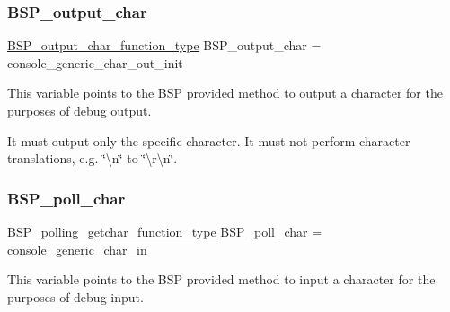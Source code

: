 \subsubsection{\texorpdfstring{BSP\_output\_char}{BSP\_output\_char}}
{\footnotesize\ttfamily \mbox{\hyperlink{bspIo_8h_a0b0dff1c3d35110ae303b4098c60dc14}{B\+S\+P\+\_\+output\+\_\+char\+\_\+function\+\_\+type}} B\+S\+P\+\_\+output\+\_\+char = console\+\_\+generic\+\_\+char\+\_\+out\+\_\+init}

This variable points to the B\+SP provided method to output a character for the purposes of debug output.

It must output only the specific character. It must not perform character translations, e.\+g. \char`\"{}\textbackslash{}n\char`\"{} to \char`\"{}\textbackslash{}r\textbackslash{}n\char`\"{}. \mbox{\label{mpc55xxevb_2console_2console-generic_8c_ae5846eecdfa8f2813504371bf01c29b0}} 
\subsubsection{\texorpdfstring{BSP\_poll\_char}{BSP\_poll\_char}}
{\footnotesize\ttfamily \mbox{\hyperlink{bspIo_8h_a132b9ceff428a634ece5dfaac7ef1006}{B\+S\+P\+\_\+polling\+\_\+getchar\+\_\+function\+\_\+type}} B\+S\+P\+\_\+poll\+\_\+char = console\+\_\+generic\+\_\+char\+\_\+in}

This variable points to the B\+SP provided method to input a character for the purposes of debug input. 
